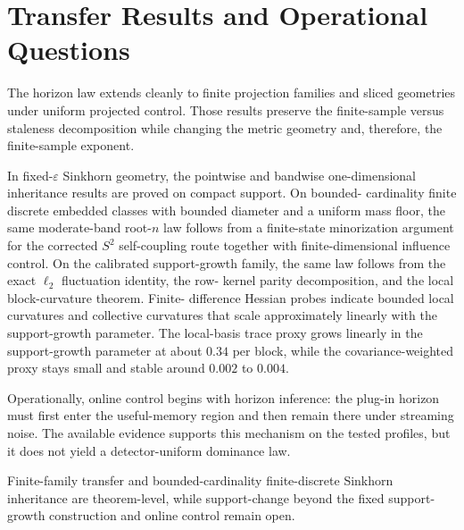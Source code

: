 \section{Transfer Results and Operational Questions}\label{sec:extensions_status}

The horizon law extends cleanly to finite projection families and sliced
geometries under uniform projected control. Those results preserve the
finite-sample versus staleness decomposition while changing the metric geometry
and, therefore, the finite-sample exponent.

In fixed-$\varepsilon$ Sinkhorn geometry, the pointwise and bandwise
one-dimensional inheritance results are proved on compact support. On bounded-
cardinality finite discrete embedded classes with bounded diameter and a uniform
mass floor, the same moderate-band root-$n$ law follows from a finite-state
minorization argument for the corrected $S^2$ self-coupling route together with
finite-dimensional influence control. On the calibrated support-growth family,
the same law follows from the exact $\ell_2$ fluctuation identity, the row-
kernel parity decomposition, and the local block-curvature theorem. Finite-
difference Hessian probes indicate bounded local curvatures and collective
curvatures that scale approximately linearly with the support-growth parameter.
The local-basis trace proxy grows linearly in the support-growth parameter at
about $0.34$ per block, while the covariance-weighted proxy stays small and
stable around $0.002$ to $0.004$.

Operationally, online control begins with horizon inference: the plug-in horizon
must first enter the useful-memory region and then remain there under streaming
noise. The available evidence supports this mechanism on the tested profiles,
but it does not yield a detector-uniform dominance law.

Finite-family transfer and bounded-cardinality finite-discrete Sinkhorn
inheritance are theorem-level, while support-change beyond the fixed support-
growth construction and online control remain open.
